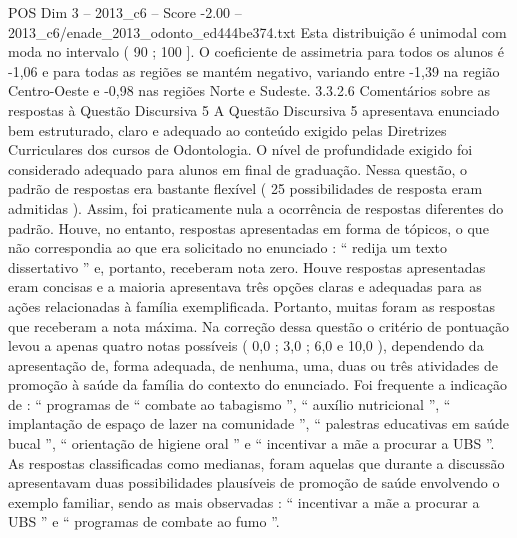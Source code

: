 \begin{textsample}{POS Dim 3 – 2013\_c6 – Score -2.00 – 2013\_c6/enade\_2013\_odonto\_ed444be374.txt}
Esta distribuição é unimodal com moda no intervalo ( 90 ; 100 ].
O coeficiente de assimetria para todos os alunos é -1,06 e para todas as regiões se mantém negativo, variando entre -1,39 na região Centro-Oeste e -0,98 nas regiões Norte e Sudeste. 3.3.2.6 Comentários sobre as respostas à Questão Discursiva 5 A Questão Discursiva 5 apresentava enunciado bem estruturado, claro e adequado ao conteúdo exigido pelas Diretrizes Curriculares dos cursos de Odontologia.
O nível de profundidade exigido foi considerado adequado para alunos em final de graduação.
Nessa questão, o padrão de respostas era bastante flexível ( 25 possibilidades de resposta eram admitidas ).
Assim, foi praticamente nula a ocorrência de respostas diferentes do padrão.
Houve, no entanto, respostas apresentadas em forma de tópicos, o que não correspondia ao que era solicitado no enunciado : “ redija um texto dissertativo ” e, portanto, receberam nota zero.
Houve respostas apresentadas eram concisas e a maioria apresentava três opções claras e adequadas para as ações relacionadas à família exemplificada.
Portanto, muitas foram as respostas que receberam a nota máxima.
Na correção dessa questão o critério de pontuação levou a apenas quatro notas possíveis ( 0,0 ; 3,0 ; 6,0 e 10,0 ), dependendo da apresentação de, forma adequada, de nenhuma, uma, duas ou três atividades de promoção à saúde da família do contexto do enunciado.
Foi frequente a indicação de : “ programas de “ combate ao tabagismo ”, “ auxílio nutricional ”, “ implantação de espaço de lazer na comunidade ”, “ palestras educativas em saúde bucal ”, “ orientação de higiene oral ” e “ incentivar a mãe a procurar a UBS ”.
As respostas classificadas como medianas, foram aquelas que durante a discussão apresentavam duas possibilidades plausíveis de promoção de saúde envolvendo o exemplo familiar, sendo as mais observadas : “ incentivar a mãe a procurar a UBS ” e “ programas de combate ao fumo ”.

\end{textsample}
